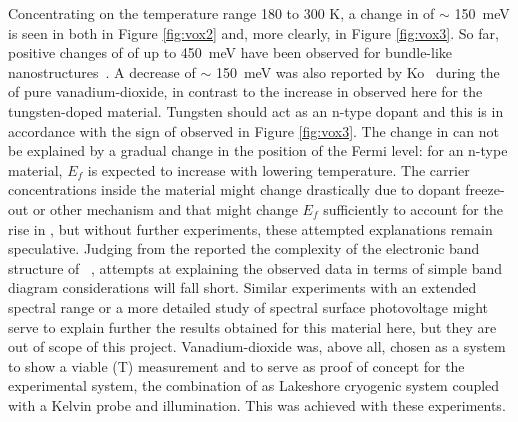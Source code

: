 Concentrating on the temperature range 180 to 300 K, a change in \wf{} of $\sim$ \SI{150}{\milli\electronvolt} is seen in both in Figure \ref{fig:vox2} and, more clearly, in Figure \ref{fig:vox3}. So far, positive changes of \wf{} of up to \SI{450}{\milli\electronvolt} have been observed for bundle-like \vadiox{} nanostructures~\cite{yin_450change}. A decrease of $\sim$ \SI{150}{\milli\electronvolt} was also reported by Ko~\cite{ko_kp} during the \mit{} of pure vanadium-dioxide, in contrast to the increase in \wf{} observed here for the tungsten-doped material. Tungsten should act as an n-type dopant and this is in accordance with the sign of \spv{} observed in Figure \ref{fig:vox3}. The change in \wf{} can not be explained by a gradual change in the position of the Fermi level: for an n-type material, $E_f$ is expected to increase with lowering temperature. The carrier concentrations inside the material might change drastically due to dopant freeze-out or other mechanism and that might change $E_f$ sufficiently to account for the rise in \wf{}, but without further experiments, these attempted explanations remain speculative. Judging from the reported the complexity of the electronic band structure of \vadiox{}~\cite{eyert_theobands,booth_theobands}, attempts at explaining the observed data in terms of simple band diagram considerations will fall short. Similar experiments with an extended spectral range or a more detailed study of spectral surface photovoltage might serve to explain further the results obtained for this material here, but they are out of scope of this project. Vanadium-dioxide was, above all, chosen as a system to show a viable \spv{}(T) measurement and to serve as proof of concept for the experimental system, \ie{} the combination of as Lakeshore cryogenic system coupled with a \McA{} Kelvin probe and \led{} illumination. This was achieved with these experiments.
\newpage
